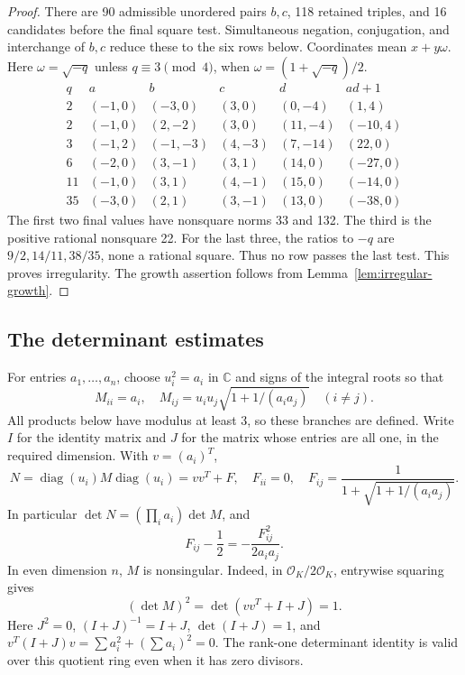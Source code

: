 \documentclass[12pt]{article}
\numberwithin{equation}{section}
\begin{document}
\begin{proof}
There are 90 admissible unordered pairs \(b,c\), 118 retained triples, and 16
candidates before the final square test. Simultaneous negation,
conjugation, and interchange of \(b,c\) reduce these to the six rows below.
Coordinates mean \(x+y\omega\). Here \(\omega=\sqrt{-q}\) unless
\(q\equiv3\pmod4\), when \(\omega=(1+\sqrt{-q})/2\).
\[
\begin{array}{c|rrrrr}
q&a&b&c&d&ad+1\\\hline
2&(-1,0)&(-3,0)&(3,0)&(0,-4)&(1,4)\\
2&(-1,0)&(2,-2)&(3,0)&(11,-4)&(-10,4)\\
3&(-1,2)&(-1,-3)&(4,-3)&(7,-14)&(22,0)\\
6&(-2,0)&(3,-1)&(3,1)&(14,0)&(-27,0)\\
11&(-1,0)&(3,1)&(4,-1)&(15,0)&(-14,0)\\
35&(-3,0)&(2,1)&(3,-1)&(13,0)&(-38,0)
\end{array}
\]
The first two final values have nonsquare norms 33 and 132. The third is
the positive rational nonsquare 22. For the last three, the ratios to
\(-q\) are \(9/2,14/11,38/35\), none a rational square. Thus no row
passes the last test. This proves irregularity. The growth assertion
follows from Lemma~\ref{lem:irregular-growth}.
\end{proof}

\subsection{The determinant estimates}
For entries \(a_1,\ldots,a_n\), choose \(u_i^2=a_i\) in \(\mathbb C\)
and signs of the integral roots so that
\[
 M_{ii}=a_i,\quad
 M_{ij}=u_i u_j\sqrt{1+1/(a_i a_j)}\quad(i\ne j).
\]
All products below have modulus at least 3, so these branches are defined.
Write $I$ for the identity matrix and $J$ for the matrix whose entries
are all one, in the required dimension. With \(v=(a_i)^T\),
\begin{equation}\label{eq:integrated-1}
N=\operatorname{diag}(u_i)M\operatorname{diag}(u_i)
   =vv^T+F,\quad F_{ii}=0,\quad
 F_{ij}=\frac1{1+\sqrt{1+1/(a_i a_j)}}.
\end{equation}
In particular \(\det N=(\prod_i a_i)\det M\), and
\begin{equation}\label{eq:integrated-2}
F_{ij}-\frac12=-\frac{F_{ij}^2}{2a_i a_j}.
\end{equation}
In even dimension \(n\), \(M\) is nonsingular. Indeed, in
\(\mathcal O_K/2\mathcal O_K\), entrywise squaring gives
\[
 (\det M)^2=\det(vv^T+I+J)=1.
\]
Here \(J^2=0\), \((I+J)^{-1}=I+J\), \(\det(I+J)=1\), and
\(v^T(I+J)v=\sum a_i^2+(\sum a_i)^2=0\). The rank-one determinant
identity is valid over this quotient ring even when it has zero divisors.
\end{document}
